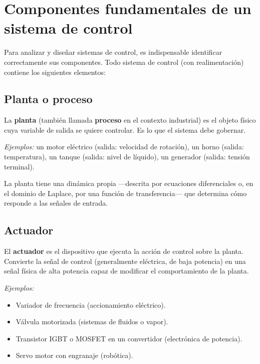 \section{Componentes fundamentales de un sistema de control}
\label{sec:intro-componentes}

Para analizar y diseñar sistemas de control, es indispensable identificar
correctamente sus componentes. Todo sistema de control (con realimentación)
contiene los siguientes elementos:

\subsection{Planta o proceso}

La \textbf{planta} (también llamada \textbf{proceso} en el contexto industrial)
es el objeto físico cuya variable de salida se quiere controlar. Es lo que
el sistema debe gobernar.

\textit{Ejemplos:} un motor eléctrico (salida: velocidad de rotación), un horno
(salida: temperatura), un tanque (salida: nivel de líquido), un generador
(salida: tensión terminal).

La planta tiene una dinámica propia ---descrita por ecuaciones diferenciales
o, en el dominio de Laplace, por una función de transferencia--- que determina
cómo responde a las señales de entrada.

\subsection{Actuador}

El \textbf{actuador} es el dispositivo que ejecuta la acción de control sobre
la planta. Convierte la señal de control (generalmente eléctrica, de baja
potencia) en una señal física de alta potencia capaz de modificar el
comportamiento de la planta.

\textit{Ejemplos:}
\begin{itemize}
  \item Variador de frecuencia (accionamiento eléctrico).
  \item Válvula motorizada (sistemas de fluidos o vapor).
  \item Transistor IGBT o MOSFET en un convertidor (electrónica de potencia).
  \item Servo motor con engranaje (robótica).
\end{itemize}

